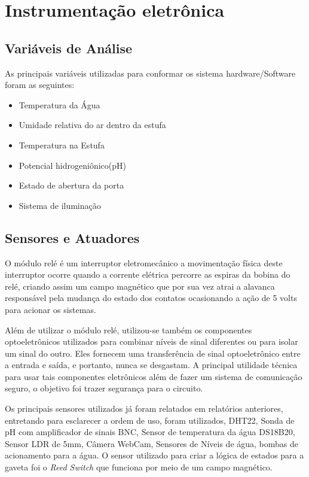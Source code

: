 \section{Instrumentação eletrônica}

\subsection{Variáveis de Análise}

As principais variáveis utilizadas para conformar os sistema hardware/Software foram as seguintes:

\begin{itemize}
	\item Temperatura da Água
	\item Umidade relativa do ar dentro da estufa
	\item Temperatura na Estufa
	\item Potencial hidrogeniônico(pH)
	\item Estado de abertura da porta
	\item Sistema de iluminação
\end{itemize}

\subsection{Sensores e Atuadores}

O módulo relé é um interruptor eletromecânico a movimentação física deste interruptor ocorre quando a corrente elétrica percorre as espiras da bobina do relé, criando assim um campo magnético que por sua vez atrai a alavanca responsável pela mudança do estado dos contatos ocasionando a ação de 5 volts para acionar os sistemas. 

Além de utilizar o módulo relé, utilizou-se também os componentes optoeletrônicos utilizados para combinar níveis de sinal diferentes ou para isolar um sinal do outro. Eles fornecem uma transferência de sinal optoeletrônico entre a entrada e saída, e portanto, nunca se desgastam. A principal utilidade técnica para usar tais componentes eletrônicos além de fazer um sistema de comunicação seguro, o objetivo foi trazer segurança para o circuito.

Os principais sensores utilizados já foram relatados em relatórios anteriores, entretando para esclarecer a ordem de uso, foram utilizados, DHT22, Sonda de pH com amplificador de sinais BNC, Sensor de temperatura da água DS18B20, Sensor LDR de 5mm, Câmera WebCam, Sensores de Níveis de água, bombas de acionamento para a água. O sensor utilizado para criar a lógica de estados para a gaveta foi o \textit{Reed Switch} que funciona por meio de um campo magnético.

